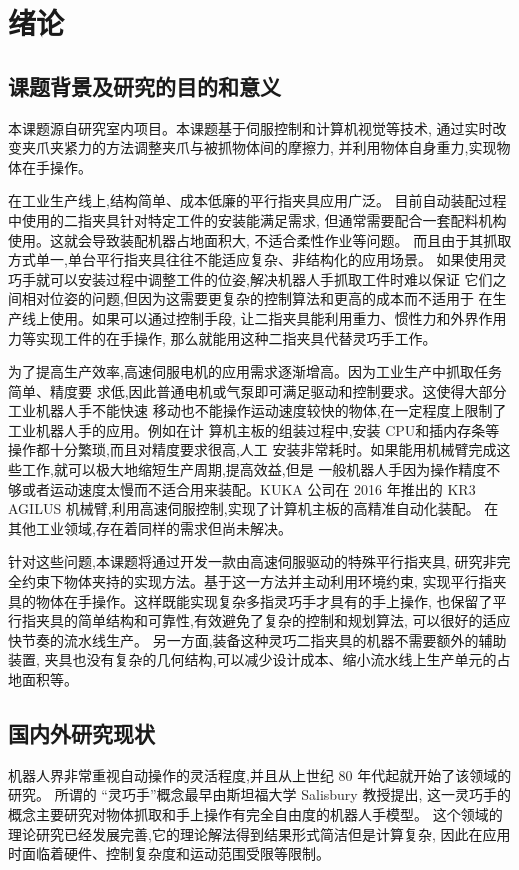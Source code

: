 \chapter{绪论}

\section{课题背景及研究的目的和意义}
本课题源自研究室内项目。本课题基于伺服控制和计算机视觉等技术, 
通过实时改变夹爪夹紧力的方法调整夹爪与被抓物体间的摩擦力, 
并利用物体自身重力,实现物体在手操作。

在工业生产线上,结构简单、成本低廉的平行指夹具应用广泛。
目前自动装配过程中使用的二指夹具针对特定工件的安装能满足需求,
但通常需要配合一套配料机构使用。这就会导致装配机器占地面积大,
不适合柔性作业等问题。
而且由于其抓取方式单一,单台平行指夹具往往不能适应复杂、非结构化的应用场景。
如果使用灵巧手就可以安装过程中调整工件的位姿,解决机器人手抓取工件时难以保证
它们之间相对位姿的问题,但因为这需要更复杂的控制算法和更高的成本而不适用于
在生产线上使用。如果可以通过控制手段,
让二指夹具能利用重力、惯性力和外界作用力等实现工件的在手操作,
那么就能用这种二指夹具代替灵巧手工作。

为了提高生产效率,高速伺服电机的应用需求逐渐增高。因为工业生产中抓取任务简单、精度要
求低,因此普通电机或气泵即可满足驱动和控制要求。这使得大部分工业机器人手不能快速
移动也不能操作运动速度较快的物体,在一定程度上限制了工业机器人手的应用。例如在计
算机主板的组装过程中,安装 CPU和插内存条等操作都十分繁琐,而且对精度要求很高,人工
安装非常耗时。如果能用机械臂完成这些工作,就可以极大地缩短生产周期,提高效益,但是
一般机器人手因为操作精度不够或者运动速度太慢而不适合用来装配。KUKA 公司在 2016
年推出的 KR3 AGILUS 机械臂,利用高速伺服控制,实现了计算机主板的高精准自动化装配。
在其他工业领域,存在着同样的需求但尚未解决。

针对这些问题,本课题将通过开发一款由高速伺服驱动的特殊平行指夹具,
研究非完全约束下物体夹持的实现方法。基于这一方法并主动利用环境约束,
实现平行指夹具的物体在手操作。这样既能实现复杂多指灵巧手才具有的手上操作,
也保留了平行指夹具的简单结构和可靠性,有效避免了复杂的控制和规划算法,
可以很好的适应快节奏的流水线生产。
另一方面,装备这种灵巧二指夹具的机器不需要额外的辅助装置,
夹具也没有复杂的几何结构,可以减少设计成本、缩小流水线上生产单元的占地面积等。

\section{国内外研究现状}
机器人界非常重视自动操作的灵活程度,并且从上世纪 80 年代起就开始了该领域的研究。
所谓的 “灵巧手”概念最早由斯坦福大学 Salisbury 教授提出,
这一灵巧手的概念主要研究对物体抓取和手上操作有完全自由度的机器人手模型。
这个领域的理论研究已经发展完善,它的理论解法得到结果形式简洁但是计算复杂,
因此在应用时面临着硬件、控制复杂度和运动范围受限等限制\cite{ref1}。

